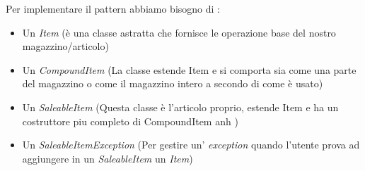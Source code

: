 \documentclass[12pt]{article}
\begin{document}
Per implementare il pattern abbiamo bisogno di :
\begin{itemize}
	\item Un \textit{Item} (è una classe astratta che fornisce le operazione base del nostro magazzino/articolo)
	\item Un \textit{CompoundItem} (La classe estende Item e si comporta sia come una parte del magazzino o come il magazzino intero a secondo di come è usato)
	\item Un \textit{SaleableItem} (Questa classe è l'articolo proprio, estende Item e ha un costruttore piu completo di CompoundItem anh )
	\item Un  \textit{SaleableItemException} (Per gestire un' \textit{exception} quando l'utente prova ad aggiungere in un \textit{SaleableItem} un \textit{Item})
\end{itemize}
\end{document}
